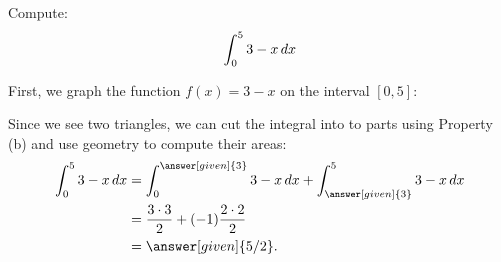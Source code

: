 \documentclass{ximera}
\begin{document}
\begin{example}
  Compute:
  \[
  \int_0^5 3-x \mathop{}\!d x
  \]
  \begin{explanation}
    First, we graph the function $f(x)=3-x$ on the interval $[0,5]$:
  \begin{image}
    \end{image}
Since we see two triangles, we can cut the integral into to parts using Property (b) and use geometry to compute their areas:
    \begin{align*}
    \int_0^5 3-x \d x &= \int_0^{\answer[given]{3}} 3-x\d x + \int_{\answer[given]{3}}^5 3-x \d x\\
    &= \frac{3\cdot 3}{2} + (-1)\frac{2\cdot 2}{2}\\
    &=\answer[given]{5/2}.
    \end{align*}
  \end{explanation}
\end{example}
\end{document}
